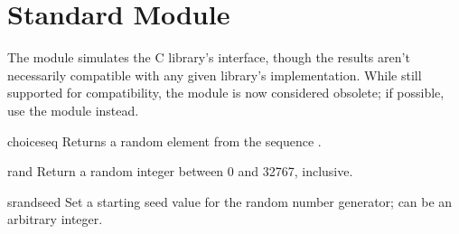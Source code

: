 \section{Standard Module }
\label{module-rand}

The  module simulates the C library's 
interface, though the results aren't necessarily compatible with any
given library's implementation.  While still supported for
compatibility, the  module is now considered obsolete; if
possible, use the  module instead.


\begin{funcdesc}{choice}{seq}
Returns a random element from the sequence .
\end{funcdesc}

\begin{funcdesc}{rand}{}
Return a random integer between 0 and 32767, inclusive.
\end{funcdesc}

\begin{funcdesc}{srand}{seed}
Set a starting seed value for the random number generator; 
can be an arbitrary integer. 
\end{funcdesc}

\begin{seealso}
\end{seealso}

